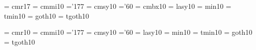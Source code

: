  \font\svtnrm  = cmr17                %
 \font\svtnmi  = cmmi10    %
    \skewchar\svtnmi ='177          %
 \font\svtnsy  = cmsy10    %
    \skewchar\svtnsy ='60           %
 \font\svtnbf  = cmbx10    %
 \font\svtnly  = lasy10   %
\font\svtnmin  = min10    %
\font\svtntmin = tmin10   %
\font\svtngt   = goth10   %
\font\svtntgt  = tgoth10  %
  

 \font\twtyrm  = cmr10     %
 \font\twtymi  = cmmi10    %
    \skewchar\twtymi ='177          %
 \font\twtysy  = cmsy10    %
    \skewchar\twtysy ='60           %
 \font\twtyly  = lasy10   %
\font\twtymin  = min10    %
\font\twtytmin = tmin10   %
\font\twtygt   = goth10   %
\font\twtytgt  = tgoth10  %

